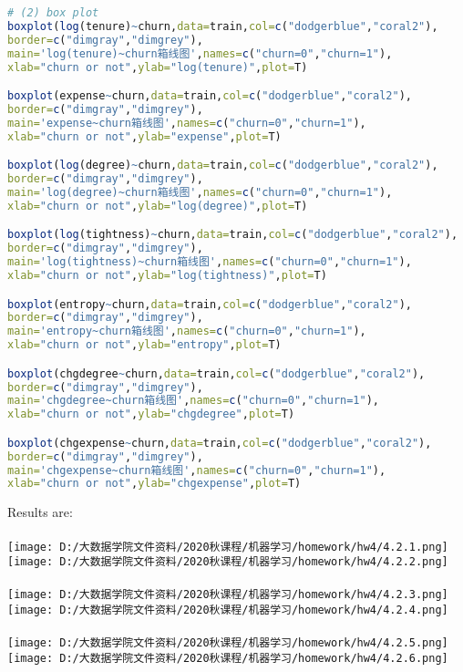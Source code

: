 \documentclass[]{article}
\begin{document}
\begin{lstlisting}[language=R]
# (2) box plot
boxplot(log(tenure)~churn,data=train,col=c("dodgerblue","coral2"),
border=c("dimgray","dimgrey"),
main='log(tenure)~churn箱线图',names=c("churn=0","churn=1"),
xlab="churn or not",ylab="log(tenure)",plot=T)

boxplot(expense~churn,data=train,col=c("dodgerblue","coral2"),
border=c("dimgray","dimgrey"),
main='expense~churn箱线图',names=c("churn=0","churn=1"),
xlab="churn or not",ylab="expense",plot=T)

boxplot(log(degree)~churn,data=train,col=c("dodgerblue","coral2"),
border=c("dimgray","dimgrey"),
main='log(degree)~churn箱线图',names=c("churn=0","churn=1"),
xlab="churn or not",ylab="log(degree)",plot=T)

boxplot(log(tightness)~churn,data=train,col=c("dodgerblue","coral2"),
border=c("dimgray","dimgrey"),
main='log(tightness)~churn箱线图',names=c("churn=0","churn=1"),
xlab="churn or not",ylab="log(tightness)",plot=T)

boxplot(entropy~churn,data=train,col=c("dodgerblue","coral2"),
border=c("dimgray","dimgrey"),
main='entropy~churn箱线图',names=c("churn=0","churn=1"),
xlab="churn or not",ylab="entropy",plot=T)

boxplot(chgdegree~churn,data=train,col=c("dodgerblue","coral2"),
border=c("dimgray","dimgrey"),
main='chgdegree~churn箱线图',names=c("churn=0","churn=1"),
xlab="churn or not",ylab="chgdegree",plot=T)

boxplot(chgexpense~churn,data=train,col=c("dodgerblue","coral2"),
border=c("dimgray","dimgrey"),
main='chgexpense~churn箱线图',names=c("churn=0","churn=1"),
xlab="churn or not",ylab="chgexpense",plot=T)
\end{lstlisting}
Results are:\\\\
\texttt{[image: D:/大数据学院文件资料/2020秋课程/机器学习/homework/hw4/4.2.1.png]}
\texttt{[image: D:/大数据学院文件资料/2020秋课程/机器学习/homework/hw4/4.2.2.png]}\\\\
\texttt{[image: D:/大数据学院文件资料/2020秋课程/机器学习/homework/hw4/4.2.3.png]}
\texttt{[image: D:/大数据学院文件资料/2020秋课程/机器学习/homework/hw4/4.2.4.png]}\\\\
\texttt{[image: D:/大数据学院文件资料/2020秋课程/机器学习/homework/hw4/4.2.5.png]}
\texttt{[image: D:/大数据学院文件资料/2020秋课程/机器学习/homework/hw4/4.2.6.png]}\\\\
\end{document}
